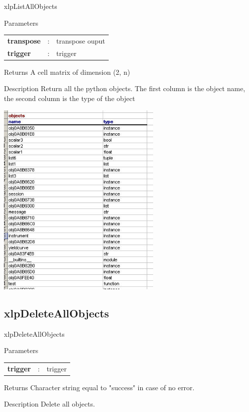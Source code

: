 \begin{xlpfunctitle}{xlpListAllObjects}

\begin{xlpfunc}{Parameters}
\begin{tabular}{p{3.5cm}cl}
\textbf{transpose}& : & transpose ouput \\
\textbf{trigger}& : & trigger 
\end{tabular}
\end{xlpfunc}

\begin{xlpfunc}{Returns}
A cell matrix of dimension (2, n)
\end{xlpfunc}

\begin{xlpfunc}{Description}
Return all the python objects. The first column is the object name, the second column is the type of the object 

\includegraphics[width=8cm]{images/objects.jpg}
\end{xlpfunc}
\end{xlpfunctitle}


\subsection{xlpDeleteAllObjects}

\begin{xlpfunctitle}{xlpDeleteAllObjects}

\begin{xlpfunc}{Parameters}
\begin{tabular}{p{3.5cm}cl}
\textbf{trigger}& : & trigger 
\end{tabular}
\end{xlpfunc}


\begin{xlpfunc}{Returns}
Character string equal to "success" in case of no error.
\end{xlpfunc}

\begin{xlpfunc}{Description}
Delete all objects.
\end{xlpfunc}
\end{xlpfunctitle}

